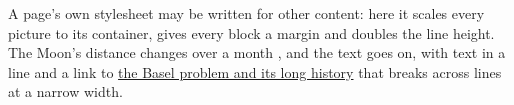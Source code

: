 A page's own stylesheet may be written for other content: here it scales
every picture to its container, gives every block a margin and doubles the
line height. The Moon's distance changes over a month , and the text
goes on, with  text in a line and a link to
\href{https://en.wikipedia.org/wiki/Basel_problem}{the Basel problem and its
long history} that breaks across lines at a narrow width.
